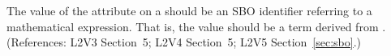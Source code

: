 The value of the  attribute on a \Trigger should be an SBO
identifier referring to a mathematical expression.  That is, the value
should be a term derived from \sbomathformula.  (References: 
L2V3 Section~5; L2V4 Section~5; L2V5 Section~\ref{sec:sbo}.)
